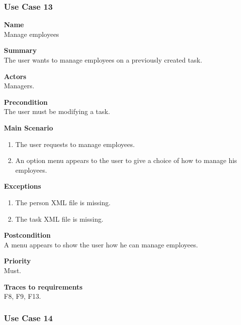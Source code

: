 \documentclass[12pt]{article}
\begin{document}
\subsubsection{Use Case 13} \label{uc:13}

\noindent
{\bf Name}\\
Manage employees

\noindent
{\bf Summary}\\
The user wants to manage employees on a previously created task.

\noindent
{\bf Actors}\\
Managers.

\noindent
{\bf Precondition}\\
The user must be modifying a task.

\noindent
{\bf Main Scenario}\\
\vspace*{-0.35in}
\begin{enumerate}
\item The user requests to manage employees.
\vspace*{-0.1in}
\item An option menu appears to the user to give a choice of how to manage his employees.
\end{enumerate}
\vspace*{-0.1in}

\noindent
{\bf Exceptions}\\
\vspace*{-0.35in}
\begin{enumerate}
\item The person XML file is missing.
\vspace*{-0.1in}
\item The task XML file is missing.
\end{enumerate}
\vspace*{-0.1in}

\noindent
{\bf Postcondition}\\
A menu appears to show the user how he can manage employees.

\noindent
{\bf Priority}\\
Must.

\noindent
{\bf Traces to requirements}\\
F8, F9, F13.

\subsubsection{Use Case 14} \label{uc:14}
\end{document}
